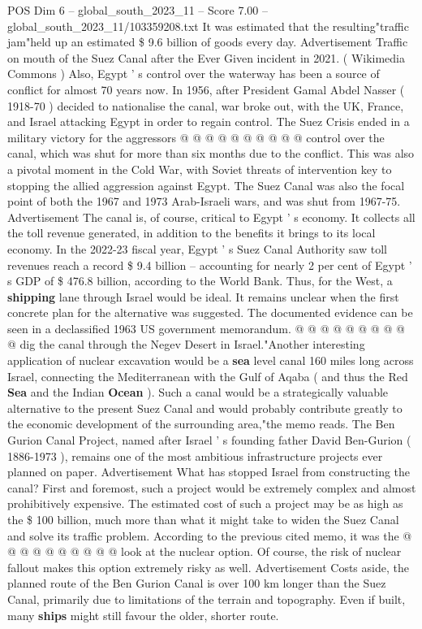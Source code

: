 \begin{textsample}{POS Dim 6 – global\_south\_2023\_11 – Score 7.00 – global\_south\_2023\_11/103359208.txt}
It was estimated that the resulting"traffic jam"held up an estimated \$ 9.6 billion of goods every day.
Advertisement Traffic on mouth of the Suez Canal after the Ever Given incident in 2021. ( Wikimedia Commons ) Also, Egypt ' s control over the waterway has been a source of conflict for almost 70 years now.
In 1956, after President Gamal Abdel Nasser ( 1918-70 ) decided to nationalise the canal, war broke out, with the UK, France, and Israel attacking Egypt in order to regain control.
The Suez Crisis ended in a military victory for the aggressors @ @ @ @ @ @ @ @ @ @ control over the canal, which was shut for more than six months due to the conflict.
This was also a pivotal moment in the Cold War, with Soviet threats of intervention key to stopping the allied aggression against Egypt.
The Suez Canal was also the focal point of both the 1967 and 1973 Arab-Israeli wars, and was shut from 1967-75.
Advertisement The canal is, of course, critical to Egypt ' s economy.
It collects all the toll revenue generated, in addition to the benefits it brings to its local economy.
In the 2022-23 fiscal year, Egypt ' s Suez Canal Authority saw toll revenues reach a record \$ 9.4 billion -- accounting for nearly 2 per cent of Egypt ' s GDP of \$ 476.8 billion, according to the World Bank.
Thus, for the West, a \textbf{shipping} lane through Israel would be ideal.
It remains unclear when the first concrete plan for the alternative was suggested.
The documented evidence can be seen in a declassified 1963 US government memorandum. @ @ @ @ @ @ @ @ @ @ dig the canal through the Negev Desert in Israel."Another interesting application of nuclear excavation would be a \textbf{sea} level canal 160 miles long across Israel, connecting the Mediterranean with the Gulf of Aqaba ( and thus the Red \textbf{Sea} and the Indian \textbf{Ocean} ).
Such a canal would be a strategically valuable alternative to the present Suez Canal and would probably contribute greatly to the economic development of the surrounding area,"the memo reads.
The Ben Gurion Canal Project, named after Israel ' s founding father David Ben-Gurion ( 1886-1973 ), remains one of the most ambitious infrastructure projects ever planned on paper.
Advertisement What has stopped Israel from constructing the canal?
First and foremost, such a project would be extremely complex and almost prohibitively expensive.
The estimated cost of such a project may be as high as the \$ 100 billion, much more than what it might take to widen the Suez Canal and solve its traffic problem.
According to the previous cited memo, it was the @ @ @ @ @ @ @ @ @ @ look at the nuclear option.
Of course, the risk of nuclear fallout makes this option extremely risky as well.
Advertisement Costs aside, the planned route of the Ben Gurion Canal is over 100 km longer than the Suez Canal, primarily due to limitations of the terrain and topography.
Even if built, many \textbf{ships} might still favour the older, shorter route.

\end{textsample}
